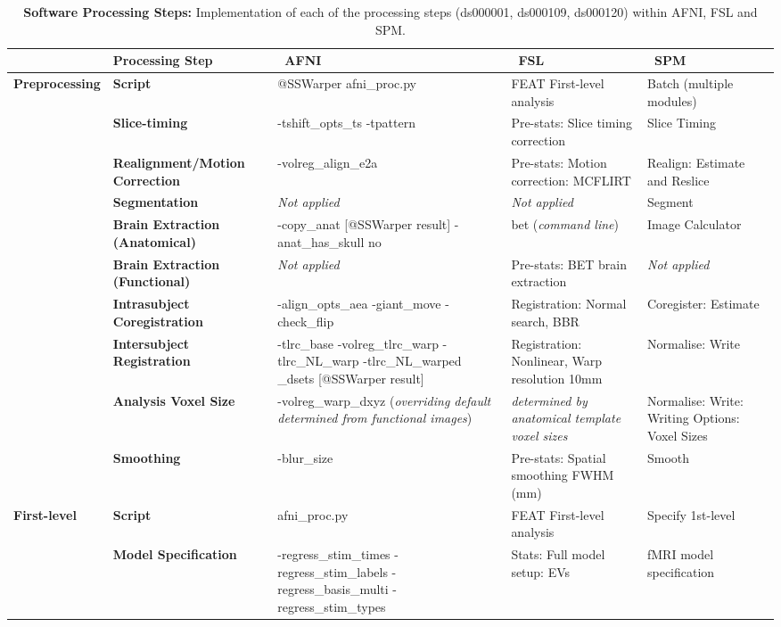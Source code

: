 \begin{table}[htbp]
\caption{\textbf{Software Processing Steps:} Implementation of  each of the processing steps (ds000001, ds000109, ds000120) within AFNI, FSL and SPM.}
\centering
\footnotesize
\hspace*{-1.5cm}
\begin{tabular}{@{}p{}*{4}{L{\tabcolsep\relax}}@{}}
\toprule
& \textbf{Processing Step} & \ \textbf{AFNI} & \ \textbf{FSL} & \ \textbf{SPM} \\
\midrule
\textbf{Preprocessing} & \textbf{Script} & @SSWarper afni\_proc.py & FEAT First-level analysis & Batch (multiple modules) \\
\cmidrule(lr){2-5} 
& \textbf{Slice-timing} & -tshift\_opts\_ts -tpattern  & Pre-stats: Slice timing correction & Slice Timing \\
\cmidrule(lr){2-5} 
& \textbf{Realignment/Motion Correction} & -volreg\_align\_e2a & Pre-stats: Motion correction: MCFLIRT & Realign: Estimate and Reslice \\
\cmidrule(lr){2-5}
& \textbf{Segmentation} & \textit{Not applied} & \textit{Not applied} & Segment \\ 
\cmidrule(lr){2-5}
& \textbf{Brain Extraction (Anatomical)} & -copy\_anat [@SSWarper result] -anat\_has\_skull no & bet (\textit{command line}) & Image Calculator \\ 
\cmidrule(lr){2-5}
& \textbf{Brain Extraction (Functional)} & \textit{Not applied} & Pre-stats: BET brain extraction & \textit{Not applied} \\ 
\cmidrule(lr){2-5}
& \textbf{Intrasubject Coregistration} & -align\_opts\_aea -giant\_move -check\_flip & Registration: Normal search, BBR & Coregister: Estimate \\ 
\cmidrule(lr){2-5}
& \textbf{Intersubject Registration} & -tlrc\_base -volreg\_tlrc\_warp -tlrc\_NL\_warp -tlrc\_NL\_warped \_dsets [@SSWarper result] & Registration: Nonlinear, Warp resolution 10mm & Normalise: Write \\
\cmidrule(lr){2-5}
& \textbf{Analysis Voxel Size} & -volreg\_warp\_dxyz (\textit{overriding default determined from functional images}) & \textit{determined by anatomical template voxel sizes} & Normalise: Write: Writing Options: Voxel Sizes \\
\cmidrule(lr){2-5}
& \textbf{Smoothing} & -blur\_size & Pre-stats: Spatial smoothing FWHM (mm) & Smooth \\
\midrule
\textbf{First-level} & \textbf{Script} & afni\_proc.py & FEAT First-level analysis & Specify 1st-level \\
 \cmidrule(lr){2-5}
 & \textbf{Model Specification} & -regress\_stim\_times -regress\_stim\_labels -regress\_basis\_multi -regress\_stim\_types & Stats: Full model setup: EVs & fMRI model specification \\
  \cmidrule(lr){2-5}

\end{tabular}
\end{table}

